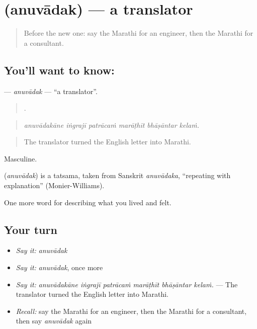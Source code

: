 \section[\texorpdfstring{\mr{अनुवादक} (anuvādak)}{अनुवादक (anuvādak)}]{ (anuvādak) — a translator}

\label{lesson:MR-C515-anuvadak}



\begin{quote}
Before the new one: say the Marathi for an engineer, then the Marathi for a consultant.
\end{quote}

\subsection*{You'll want to know: }
\textbf{} — \emph{anuvādak} — \textquotedblleft{}a translator\textquotedblright{}.

\begin{quote}
     .
\end{quote}

\begin{quote}
\emph{anuvādakāne iṅgrajī patrācaṁ marāṭhīt bhāṣāntar kelaṁ.}
\end{quote}

\begin{quote}
The translator turned the English letter into Marathi.
\end{quote}

Masculine.

\begin{cousinweb}
\textbf{} (\emph{anuvādak}) is a tatsama, taken from Sanskrit \emph{anuvādaka}, \textquotedblleft{}repeating with explanation\textquotedblright{} (Monier-Williams).
\end{cousinweb}

\begin{grammarlens}[title={What you've built}]
One more word for describing what you lived and felt.
\end{grammarlens}

\subsection*{Your turn}
\begin{itemize}
\raggedright
  \item \emph{Say it:} \emph{anuvādak}
  \item \emph{Say it:} \emph{anuvādak}, once more
  \item \emph{Say it:} \emph{anuvādakāne iṅgrajī patrācaṁ marāṭhīt bhāṣāntar kelaṁ.} — The translator turned the English letter into Marathi.
  \item \emph{Recall:} say the Marathi for an engineer, then the Marathi for a consultant, then say \emph{anuvādak} again
\end{itemize}

